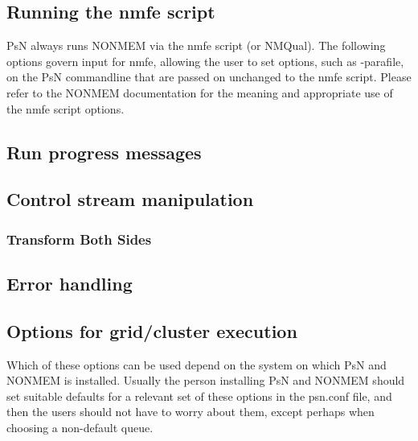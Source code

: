 \subsection{Running the nmfe script}
PsN always runs NONMEM via the nmfe script (or NMQual). 
The following options govern input for
nmfe, allowing the user to set options, such as -parafile, on the PsN commandline that
are passed on unchanged to the nmfe script.
Please refer to the NONMEM documentation for the meaning and appropriate use
of the nmfe script options.


\subsection{Run progress messages}


\subsection{Control stream manipulation}

\subsubsection{Transform Both Sides}



\subsection{Error handling}



\subsection{Options for grid/cluster execution}
Which of these options can be used depend on the system on which PsN and NONMEM is installed.
Usually the person installing PsN and NONMEM should set suitable defaults for a relevant set
of these
options in the psn.conf file, and then the users should not have to worry about them,
except perhaps when choosing a non-default queue.




